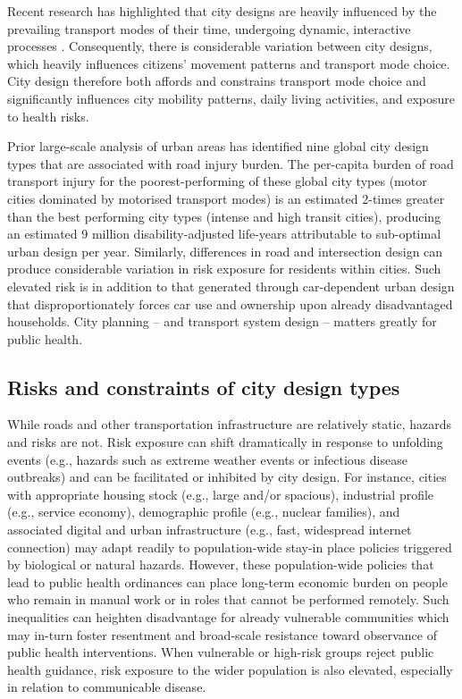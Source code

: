 \documentclass[preprint,10pt]{elsarticle} %
\begin{document}
Recent research has highlighted that city designs are heavily influenced by the prevailing transport modes of their time\cite{KNOWLES2020102607}, undergoing dynamic, interactive processes \cite{Strano2012}. Consequently, there is considerable variation between city designs, which heavily influences citizens' movement patterns and transport mode choice\cite{Thompson2020}. City design therefore both affords and constrains transport mode choice and significantly influences city mobility patterns, daily living activities, and exposure to health risks\cite{WHO2023}.

Prior large-scale analysis of urban areas has identified nine global city design types that are associated with road injury burden\cite{Thompson2020}. The per-capita burden of road transport injury for the poorest-performing of these global city types (motor cities dominated by motorised transport modes) is an estimated 2-times greater than the best performing city types (intense and high transit cities), producing an estimated 9 million disability-adjusted life-years attributable to sub-optimal urban design per year\cite{Thompson2020}. Similarly, differences in road and intersection design can produce considerable variation in risk exposure for residents within cities\cite{Wijnands_IntersectionDesign2021,MORRISON2019123}. Such elevated risk is in addition to that generated through car-dependent urban design that disproportionately forces car use and ownership upon already disadvantaged households\cite{currie2018alarming, CURL201861}. City planning -- and transport system design -- matters greatly for public health.



\subsection*{Risks and constraints of city design types}
While roads and other transportation infrastructure are relatively static, hazards and risks are not. Risk exposure can shift dramatically in response to unfolding events (e.g., hazards such as extreme weather events or infectious disease outbreaks) and can be facilitated or inhibited by city design. For instance, cities with appropriate housing stock (e.g., large and/or spacious), industrial profile (e.g., service economy), demographic profile (e.g., nuclear families), and associated digital and urban infrastructure (e.g., fast, widespread internet connection) may adapt readily to population-wide stay-in place policies triggered by biological or natural hazards\cite{hale2021global}. However, these population-wide policies that lead to public health ordinances can place long-term economic burden on people who remain in manual work or in roles that cannot be performed remotely\cite{CraigWFH,Vyas2021}. Such inequalities can heighten disadvantage for already vulnerable communities\cite{martin2020fighting} which may in-turn foster resentment and broad-scale resistance toward observance of public health interventions\cite{de2016sustainability}. When vulnerable or high-risk groups reject public health guidance, risk exposure to the wider population is also elevated, especially in relation to communicable disease\cite{koopman2005control}.
\end{document}
